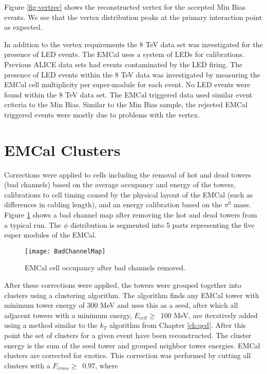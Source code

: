 Figure \ref{fig:vertrec} shows the reconstructed vertex for the accepted Min Bias events.  We see that the vertex distribution peaks at the primary interaction point as expected. 

 In addition to the vertex requirements the 8 TeV data set was investigated for the presence of LED events.  The EMCal uses a system of LEDs for calibrations.  Previous ALICE data sets had events contaminated by the LED firing.  The presence of LED events within the 8 TeV data was investigated by measuring the EMCal cell multiplicity per super-module for each event.  No LED events were found within the 8 TeV data set.
The EMCal triggered data used similar event criteria to the Min Bias.  Similar to the Min Bias sample, the rejected EMCal triggered events were mostly due to problems with the vertex.


\section{EMCal Clusters}


Corrections were applied to cells including the removal of hot and dead towers (bad channels) based on the average occupancy and energy of the towers, calibrations to cell timing caused by the physical layout of the EMCal (such as differences in cabling length), and an energy calibration based on the $\pi^{0}$ mass.   Figure \ref{fig:badchannel} shows a bad channel map after removing the hot and dead towers from a typical run.  The $\phi$ distribution is segmented into 5 parts representing the five super modules of the EMCal.  

\begin{figure}[h]
\texttt{[image: BadChannelMap]}
\centering
\caption{EMCal cell occupancy after bad channels removed.}
\label{fig:badchannel}
\end{figure}

After these corrections were applied, the towers were grouped together into clusters using a clustering algorithm.  The algorithm finds any EMCal tower with minimum tower energy of 300 MeV and uses this as a seed, after which all adjacent towers with a minimum energy, $E_{cell} \geq \,$ 100 MeV, are iteratively added using a method similar to the $k_{T}$ algorithm from Chapter \ref{ch:qcd}.  After this point the set of clusters for a given event have been reconstructed.  The cluster energy is the sum of the seed tower and grouped neighbor tower energies.  EMCal clusters are corrected for exotics.  This correction was performed by cutting all clusters with a $F_{cross} \geq \,$ 0.97, where

